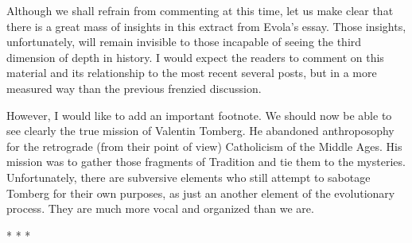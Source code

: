 Although we shall refrain from commenting at this time, let us make clear that there is a great mass of insights in this extract from Evola's essay. Those insights, unfortunately, will remain invisible to those incapable of seeing the third dimension of depth in history. I would expect the readers to comment on this material and its relationship to the most recent several posts, but in a more measured way than the previous frenzied discussion.

However, I would like to add an important footnote. We should now be able to see clearly the true mission of Valentin Tomberg. He abandoned anthroposophy for the retrograde (from their point of view) Catholicism of the Middle Ages. His mission was to gather those fragments of Tradition and tie them to the mysteries. Unfortunately, there are subversive elements who still attempt to sabotage Tomberg for their own purposes, as just an another element of the evolutionary process. They are much more vocal and organized than we are.



\begin{center}* * *\end{center}

